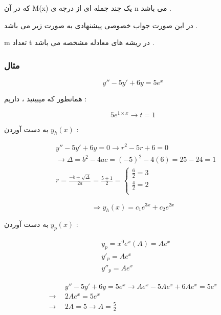 \documentclass[12pt]{book}
\begin{document}
 که در آن M(x) یک چند جمله ای از درجه ی n می باشد .

در این صورت جواب خصوصی پیشنهادی به صورت زیر می باشد .

\begin{tcolorbox}
\begin{center}
\end{center}
\end{tcolorbox}


m تعداد t
در ریشه های معادله مشخصه می باشد .

\subsubsection{مثال}

$$
y'' - 5y' + 6y = 5e^{x}
$$

همانطور که میبینید ، داریم :

$$
5e^{1 \times x} \to t = 1
$$

به دست آوردن 
$y_{h}(x)$ :

\begin{align*}
&y'' - 5y' + 6y = 0 \to r^{2} - 5r + 6 = 0 \\
&\to \Delta = b^{2} - 4ac = (-5)^{2} - 4(6) = 25 - 24 = 1 \\
&r = \frac{ -b \pm \sqrt{\Delta} }{ 2a } = \frac{5 \pm 1}{2} = \begin{cases}
\frac{6}{2} = 3 \\
\frac{4}{2} = 2 \\
\end{cases}
\end{align*}

$$
\Rightarrow y_{h}(x) = c_{1}e^{3x} + c_{2}e^{2x}
$$


به دست آوردن 
$y_{p}(x)$ :

\begin{align*}
&y_{p} = x^{0} e^{x} ( A ) = A e^{x} \\
&y'_{p} = Ae^{x} \\
&y''_{p} = Ae^{x} 
\end{align*}

\begin{align*}
&y'' - 5y' + 6y = 5e^{x} \to Ae^{x} - 5Ae^{x} + 6Ae^{x} = 5e^{x} \\
\to \:\: &2Ae^{x} = 5e^{x} \\
\to \:\: &2A = 5 \to A = \frac{5}{2} \\
\end{align*}
\end{document}
